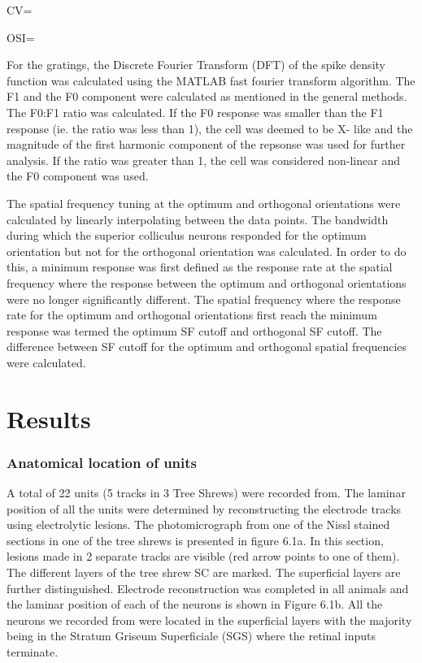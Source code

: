 	 CV=
	 
	 OSI=
	
	For the gratings, the Discrete Fourier Transform (DFT) of the spike density function was calculated using the MATLAB fast fourier transform algorithm. The F1 and the F0 component were calculated as mentioned in the general methods. The F0:F1 ratio was calculated. If the F0 response was smaller than the F1 response (ie. the ratio was less than 1), the cell was deemed to be X- like and the magnitude of the first harmonic component of the repsonse was used for further analysis. If the ratio was greater than 1, the cell was considered non-linear and the F0 component was used.
	
	The spatial frequency tuning at the optimum and orthogonal orientations were calculated by linearly interpolating between the data points. The bandwidth during which the superior colliculus neurons responded for the optimum orientation but not for the orthogonal orientation was calculated. In order to do this,  a minimum response was first defined as the response rate at the spatial frequency where the response between the optimum and orthogonal orientations were no longer significantly different. The spatial frequency where the response rate for the optimum and orthogonal orientations first reach the minimum response was termed the optimum SF cutoff and orthogonal SF cutoff. The difference between SF cutoff for the optimum and orthogonal spatial frequencies were calculated.
	
	\section{Results}
	\subsubsection{Anatomical location of units}
	
	A total of 22 units (5 tracks in  3 Tree Shrews) were recorded from. The laminar position of all the units were determined by reconstructing the electrode tracks using electrolytic lesions. The photomicrograph from one of the Nissl stained sections in one of the tree shrews is presented in figure 6.1a. In this section, lesions made in 2 separate tracks are visible (red arrow points to one of them). The different layers of the tree shrew SC are marked. The superficial layers are further distinguished. Electrode reconstruction was completed in all animals and the laminar position of each of the neurons is shown in Figure 6.1b. All the neurons we recorded from were located in the superficial layers with the majority being in the Stratum Griseum Superficiale (SGS) where the retinal inputs terminate.
	
